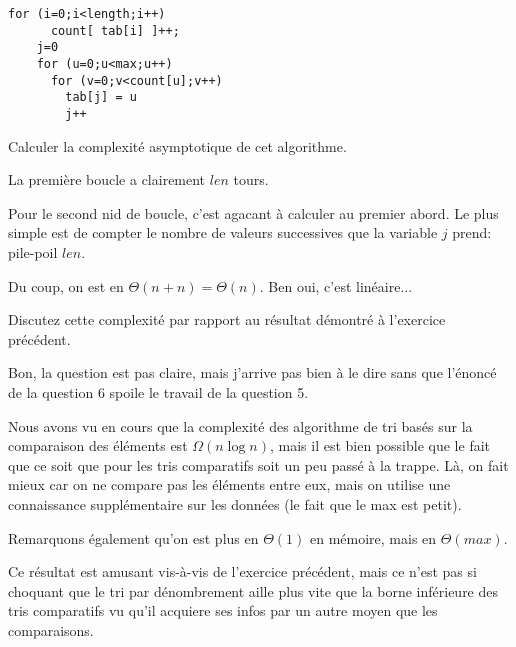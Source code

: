\documentclass[10pt]{article}\usepackage[correction]{esial}
\begin{document}
\begin{Reponse}
  \begin{Verbatim}[gobble=4]
    for (i=0;i<length;i++)
      count[ tab[i] ]++;
    j=0
    for (u=0;u<max;u++)
      for (v=0;v<count[u];v++) 
        tab[j] = u
        j++ 
  \end{Verbatim}
\end{Reponse}

\Question Calculer la complexité asymptotique de cet algorithme.

\begin{Reponse}
  La première boucle a clairement $len$ tours. 
 
  Pour le second nid de boucle, c'est agacant à calculer au premier abord. Le
  plus simple est de compter le nombre de valeurs successives que la variable
  $j$ prend: pile-poil $len$.

  Du coup, on est en $\Theta(n+n)=\Theta(n)$. Ben oui, c'est linéaire...

\end{Reponse}

\Question Discutez cette complexité par rapport au résultat démontré à
l'exercice précédent.

\begin{Reponse}
  Bon, la question est pas claire, mais j'arrive pas bien à le dire sans que
  l'énoncé de la question 6 spoile le travail de la question 5.

  Nous avons vu en cours que la complexité des algorithme de tri basés sur la
  comparaison des éléments est $\Omega(n\log n)$, mais il est bien possible que
  le fait que ce soit que pour les tris comparatifs soit un peu passé à la
  trappe. Là, on fait mieux car on ne compare pas les éléments entre eux, mais
  on utilise une connaissance supplémentaire sur les données (le fait que le
  max est petit).

  Remarquons également qu'on est plus en $\Theta(1)$ en mémoire, mais en
  $\Theta(max)$.
  \bigskip

  Ce résultat est amusant vis-à-vis de l'exercice précédent, mais ce n'est pas
  si choquant que le tri par dénombrement aille plus vite que la borne
  inférieure des tris comparatifs vu qu'il acquiere ses infos par un autre
  moyen que les comparaisons.
\end{Reponse}
\end{document}
